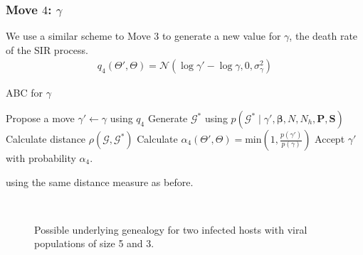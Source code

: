 \documentclass[a4paper,18pt]{report}
\begin{document}
\subsubsection{Move $4$: $\gamma$}
We use a similar scheme to Move $3$ to generate a new value for $\gamma$, the death rate of the SIR process.
\begin{eqnarray}
q_4(\Theta',\Theta)= \mathcal{N}(\log \gamma' - \log \gamma, 0 , \sigma_{\gamma}^2)
\end{eqnarray}
\begin{algorithm}
\caption{ABC for $\gamma$ \label{alg:gamma}}
\begin{algorithmic}
\STATE Propose a move $\gamma'\gets \gamma$ using $q_4$
\STATE Generate $\mathcal{G}^*$ using $p(\mathcal{G}^*\mid \gamma', \boldsymbol{\beta}, N, N_h, \mathbf{P}, \mathbf{S})$
\STATE Calculate distance $\rho(\mathcal{G},\mathcal{G}^*)$
\STATE Calculate $\alpha_{4}(\Theta',\Theta)=\textrm{min}\left(1,\frac{p(\gamma')}{p(\gamma)} \right)$
\STATE Accept $\gamma'$ with probability $\alpha_4$.
\ENDIF
\end{algorithmic}
\end{algorithm}
using the same distance measure as before.





\begin{figure}[h]
\centering
{}\\
\caption{Possible underlying genealogy for two infected hosts with viral populations of size 5 and 3.}
\end{figure}
\end{document}
